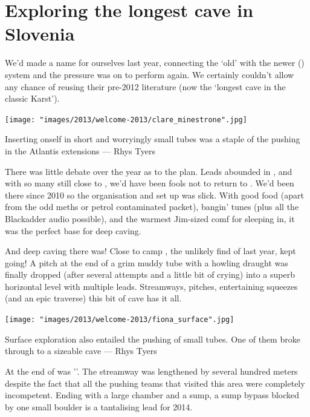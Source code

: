 
\section{Exploring the longest cave in Slovenia}

We’d made a name for ourselves last year, connecting the ‘old’  with the newer  () system and the pressure was on to perform again. We certainly couldn’t allow  any chance of reusing their pre-2012 literature (now the ‘longest cave in the classic Karst’). 

\begin{marginfigure}
\texttt{[image: "images/2013/welcome-2013/clare\_minestrone".jpg]}
\caption{Inserting onself in short and worryingly small tubes was a staple of the pushing in the Atlantis extensions --- Rhys Tyers}
\label{clare_minestrone}
\end{marginfigure}



There was little debate over the year as to the plan. Leads abounded in , and with so many still close to , we’d have been fools not to return to . We’d been there since 2010 so the organisation and set up was slick. With good food (apart from the odd meths or petrol contaminated packet), bangin’ tunes (plus all the Blackadder audio possible), and the warmest Jim-sized comf for sleeping in, it was the perfect base for deep caving.

And deep caving there was! Close to camp , the unlikely find of last year, kept going! A pitch at the end of a grim muddy tube with a howling draught was finally dropped (after several attempts and a little bit of crying) into a superb horizontal level with multiple leads. Streamways, pitches, entertaining squeezes (and an epic traverse) this bit of cave has it all.

\begin{marginfigure}
\texttt{[image: "images/2013/welcome-2013/fiona\_surface".jpg]}
\caption{Surface exploration also entailed the pushing of small tubes. One of them broke through to a sizeable cave --- Rhys Tyers}
\label{fiona_surface}
\end{marginfigure}

At the end of  was ''. The streamway was lengthened by several hundred meters despite the fact that all the pushing teams that visited this area were completely incompetent. Ending with a large chamber and a sump, a sump bypass blocked by one small boulder is a tantalising lead for 2014.

